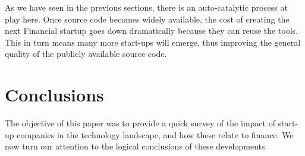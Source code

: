 \documentclass{book}
\begin{document}
As we have seen in the previous sections, there is an auto-catalytic
process at play here. Once source code becomes widely available, the
cost of creating the next Financial startup goes down dramatically
because they can reuse the tools. This in turn means many more
start-ups will emerge, thus improving the general quality of the
publicly available source code.

\section{Conclusions}

The objective of this paper was to provide a quick survey of the
impact of start-up companies in the technology landscape, and how
these relate to finance. We now turn our attention to the logical
conclusions of these developments.
\end{document}
